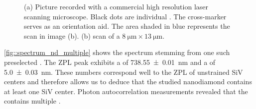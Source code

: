 			\begin{figure}[htp]
				\begin{subfigure}[t]{ 0.49\linewidth}
					\centering
					\caption{}
					\label{subfig::cross_laser_scan}
				\end{subfigure}
				\hfill
				\begin{subfigure}[t]{ 0.49\linewidth}
					\centering
					\caption{}
					\label{subfig::pp_pl_scan}
				\end{subfigure}
				\caption[Localizing suitable \nds]{(a) Picture recorded with a commercial high resolution laser scanning microscope. Black dots are individual \nds. The cross-marker serves as an orientation aid. The area shaded in blue represents the \pl scan in image (b). (b) \Pl scan of a
				$\SI{8}{\micro\metre} \times \SI{13}{\micro\metre}$. }
			\end{figure}

			\autoref{fig::spectrum_nd_multiple} shows the spectrum stemming from one such preselected \nd.
			The ZPL peak exhibits a \wl of \SI[separate-uncertainty = true]{738.55\pm0.01}{nm} and a \lw of \SI[separate-uncertainty = true]{5.0\pm0.03}{nm}.
			These numbers correspond well to the ZPL of unstrained SiV centers and therefore allows us to deduce that the studied nanodiamond contains at least one SiV center. Photon autocorrelation measurements revealed that the \nd contains multiple \sivs.

